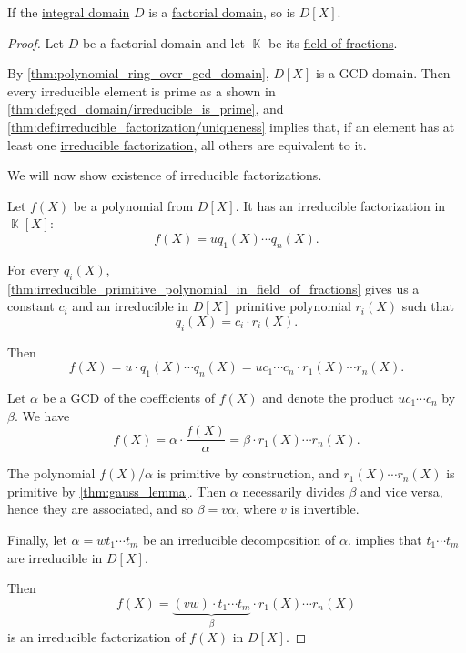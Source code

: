 \begin{proposition}\label{thm:polynomial_ring_over_factorial}
  If the \hyperref[def:integral_domain]{integral domain} \( D \) is a \hyperref[def:factorial_domain]{factorial domain}, so is \( D[X] \).
\end{proposition}
\begin{proof}
  Let \( D \) be a factorial domain and let \( \BbbK \) be its \hyperref[def:field_of_fractions]{field of fractions}.

  By \cref{thm:polynomial_ring_over_gcd_domain}, \( D[X] \) is a GCD domain. Then every irreducible element is prime as a shown in \cref{thm:def:gcd_domain/irreducible_is_prime}, and \cref{thm:def:irreducible_factorization/uniqueness} implies that, if an element has at least one \hyperref[def:irreducible_factorization]{irreducible factorization}, all others are equivalent to it.

  We will now show existence of irreducible factorizations.

  Let \( f(X) \) be a polynomial from \( D[X] \). It has an irreducible factorization in \( \BbbK[X] \):
  \begin{equation*}
    f(X) = u q_1(X) \cdots q_n(X).
  \end{equation*}

  For every \( q_i(X) \), \cref{thm:irreducible_primitive_polynomial_in_field_of_fractions} gives us a constant \( c_i \) and an irreducible in \( D[X] \) primitive polynomial \( r_i(X) \) such that
  \begin{equation*}
    q_i(X) = c_i \cdot r_i(X).
  \end{equation*}

  Then
  \begin{equation*}
    f(X)
    =
    u \cdot q_1(X) \cdots q_n(X)
    =
    u c_1 \cdots c_n \cdot r_1(X) \cdots r_n(X).
  \end{equation*}

  Let \( \alpha \) be a GCD of the coefficients of \( f(X) \) and denote the product \( u c_1 \cdots c_n \) by \( \beta \). We have
  \begin{equation*}
    f(X) = \alpha \cdot \frac {f(X)} \alpha = \beta \cdot r_1(X) \cdots r_n(X).
  \end{equation*}

  The polynomial \( f(X) / \alpha \) is primitive by construction, and \( r_1(X) \cdots r_n(X) \) is primitive by \cref{thm:gauss_lemma}. Then \( \alpha \) necessarily divides \( \beta \) and vice versa, hence they are associated, and so \( \beta = v \alpha \), where \( v \) is invertible.

  Finally, let \( \alpha = w t_1 \cdots t_m \) be an irreducible decomposition of \( \alpha \).  implies that \( t_1 \cdots t_m \) are irreducible in \( D[X] \).

  Then
  \begin{equation*}
    f(X) = \underbrace{(v w) \cdot t_1 \cdots t_m}_{\beta} \cdot r_1(X) \cdots r_n(X)
  \end{equation*}
  is an irreducible factorization of \( f(X) \) in \( D[X] \).
\end{proof}
